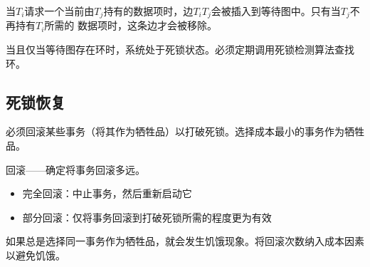 当$T_i$请求一个当前由$T_j$持有的数据项时，边$T_iT_j$会被插入到等待图中。只有当$T_j$不再持有$T_i$所需的
数据项时，这条边才会被移除。

当且仅当等待图存在环时，系统处于死锁状态。必须定期调用死锁检测算法查找环。

\subsection{死锁恢复}

必须回滚某些事务（将其作为牺牲品）以打破死锁。选择成本最小的事务作为牺牲品。

回滚——确定将事务回滚多远。
\begin{itemize}
    \item 完全回滚：中止事务，然后重新启动它
    \item 部分回滚：仅将事务回滚到打破死锁所需的程度更为有效
\end{itemize}

如果总是选择同一事务作为牺牲品，就会发生饥饿现象。将回滚次数纳入成本因素以避免饥饿。